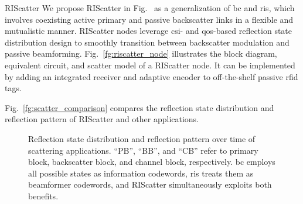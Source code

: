 \documentclass[journal,12pt,onecolumn,draftclsnofoot]{IEEEtran}
\theoremstyle{remark}
\begin{document}
\begin{section}{RIScatter}
	We propose RIScatter in Fig.~ as a generalization of \gls{bc} and \gls{ris}, which involves coexisting active primary and passive backscatter links in a flexible and mutualistic manner.
	RIScatter nodes leverage \gls{csi}- and \gls{qos}-based reflection state distribution design to smoothly transition between backscatter modulation and passive beamforming.
	Fig.~\ref{fg:riscatter_node} illustrates the block diagram, equivalent circuit, and scatter model of a RIScatter node.
	It can be implemented by adding an integrated receiver \cite{Kim2021a} and adaptive encoder \cite{He2020e} to off-the-shelf passive \gls{rfid} tags.
	\begin{figure*}[!t]
		\centering
		\caption{
		Block diagram, equivalent circuit, and scatter model of a RIScatter node.
		The solid and dashed vectors represent signal and energy flows.
		The scatter antenna behaves as a constant power source, where the voltage $V_0$ and current $I_0$ are introduced by incident electric field $\vec{E}_{\text{I}}$ and magnetic field $\vec{H}_{\text{I}}$ \cite{Huang2021}.
		}
		\label{fg:riscatter_node}
	\end{figure*}
	Fig.~\ref{fg:scatter_comparison} compares the reflection state distribution and reflection pattern of RIScatter and other applications.
	\begin{figure}[!t]
		\centering
		\caption{
			Reflection state distribution and reflection pattern over time of scattering applications.
			``PB'', ``BB'', and ``CB'' refer to primary block, backscatter block, and channel block, respectively.
			\gls{bc} employs all possible states as information codewords, \gls{ris} treats them as beamformer codewords, and RIScatter simultaneously exploits both benefits.
}
\end{figure}
\end{section}
\end{document}
